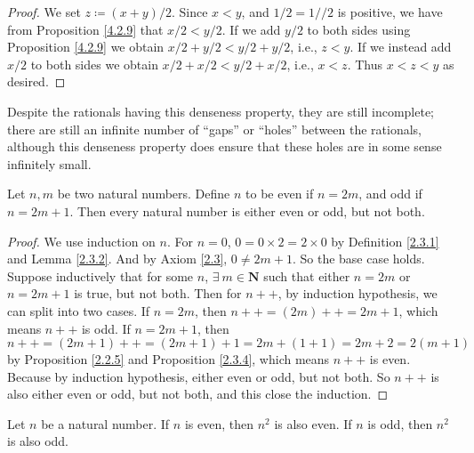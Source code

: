 \begin{proof}
    We set \(z \coloneqq (x + y) / 2\).
    Since \(x < y\), and \(1 / 2 = 1 // 2\) is positive, we have from Proposition \ref{4.2.9} that \(x / 2 < y / 2\).
    If we add \(y / 2\) to both sides using Proposition \ref{4.2.9} we obtain \(x / 2 + y / 2 < y / 2 + y / 2\), i.e., \(z < y\).
    If we instead add \(x / 2\) to both sides we obtain \(x / 2 + x / 2 < y / 2 + x / 2\), i.e., \(x < z\).
    Thus \(x < z < y\) as desired.
\end{proof}

\begin{note}
    Despite the rationals having this denseness property, they are still incomplete;
    there are still an infinite number of ``gaps'' or ``holes'' between the rationals, although this denseness property does ensure that these holes are in some sense infinitely small.
\end{note}

\begin{additional corollary}\label{ac 4.4.1}
Let \(n, m\) be two natural numbers.
Define \(n\) to be even if \(n = 2m\), and odd if \(n = 2m + 1\).
Then every natural number is either even or odd, but not both.
\end{additional corollary}

\begin{proof}
    We use induction on \(n\).
    For \(n = 0\), \(0 = 0 \times 2 = 2 \times 0\) by Definition \ref{2.3.1} and Lemma \ref{2.3.2}.
    And by Axiom \ref{2.3}, \(0 \neq 2m + 1\).
    So the base case holds.
    Suppose inductively that for some \(n\), \(\exists\ m \in \mathbf{N}\) such that either \(n = 2m\) or \(n = 2m + 1\) is true, but not both.
    Then for \(n++\), by induction hypothesis, we can split into two cases.
    If \(n = 2m\), then \(n++ = (2m)++ = 2m + 1\), which means \(n++\) is odd.
    If \(n = 2m + 1\), then \(n++ = (2m + 1)++ = (2m + 1) + 1 = 2m + (1 + 1) = 2m + 2 = 2(m + 1)\) by Proposition \ref{2.2.5} and Proposition \ref{2.3.4}, which means \(n++\) is even.
    Because by induction hypothesis, either even or odd, but not both.
    So \(n++\) is also either even or odd, but not both, and this close the induction.
\end{proof}

\begin{additional corollary}\label{ac 4.4.2}
Let \(n\) be a natural number.
If \(n\) is even, then \(n^2\) is also even.
If \(n\) is odd, then \(n^2\) is also odd.
\end{additional corollary}

